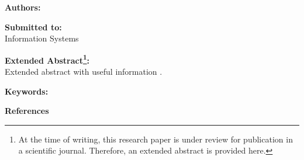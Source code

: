 \textbf{Authors: \\}

\textbf{Submitted to:\\}
Information Systems

\begin{refsection}
\textbf{Extended Abstract\footnote{At the time of writing, this research paper is under review for publication in a scientific journal. Therefore, an extended abstract is provided here.}: \\}
Extended abstract with useful information \citep{Dumas.2018}.

\textbf{Keywords: \\}

\textbf{References}
\printbibliography[heading=none,notcategory=ignore_b]
\end{refsection}

